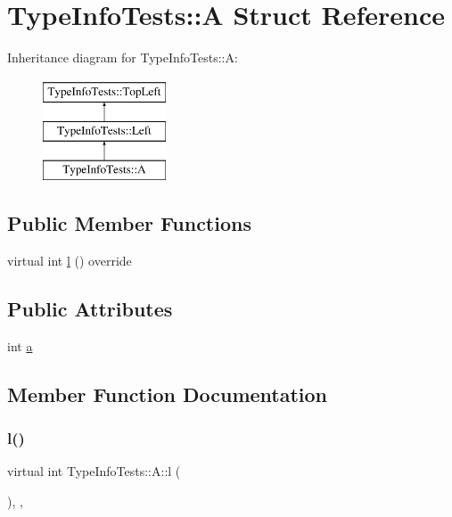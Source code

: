\hypertarget{structTypeInfoTests_1_1A}{}\section{Type\+Info\+Tests\+::A Struct Reference}
\label{structTypeInfoTests_1_1A}
Inheritance diagram for Type\+Info\+Tests\+::A\+:\begin{figure}[H]
\begin{center}
\leavevmode
\includegraphics[height=3.000000cm]{structTypeInfoTests_1_1A}
\end{center}
\end{figure}
\subsection*{Public Member Functions}
\begin{DoxyCompactItemize}
\item 
virtual int \mbox{\hyperlink{structTypeInfoTests_1_1A_a409df9b333807d1ec1f1005522a3f29b}{l}} () override
\end{DoxyCompactItemize}
\subsection*{Public Attributes}
\begin{DoxyCompactItemize}
\item 
int \mbox{\hyperlink{structTypeInfoTests_1_1A_a8e5e3ed198c72a79afaacbc51b7f417a}{a}}
\end{DoxyCompactItemize}


\subsection{Member Function Documentation}
\mbox{\label{structTypeInfoTests_1_1A_a409df9b333807d1ec1f1005522a3f29b}} 
\subsubsection{\texorpdfstring{l()}{l()}}
{\footnotesize\ttfamily virtual int Type\+Info\+Tests\+::\+A\+::l (\begin{DoxyParamCaption}{ }\end{DoxyParamCaption})\hspace{0.3cm}{\ttfamily [inline]}, {\ttfamily [override]}, {\ttfamily [virtual]}}



